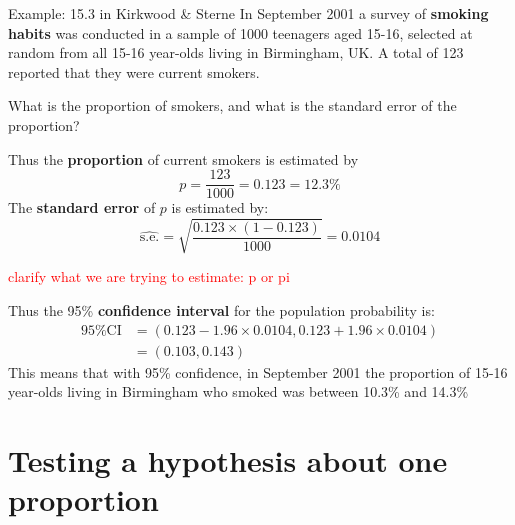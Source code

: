 \documentclass[compress, notes=hide]{beamer}
\newcommand{\hl}[1]{\textbf{#1}}
\begin{document}

\begin{frame}
\begin{block}{Example: 15.3 in Kirkwood \& Sterne}
  In September 2001 a survey of \hl{smoking habits} was conducted
  in a sample of 1000 teenagers aged 15-16, selected at random from
  all 15-16 year-olds living in Birmingham, UK. A total of 123
  reported that they were current smokers. 
  
  What is the proportion of smokers, and what is the standard error of the proportion?
\end{block}
\end{frame}

\begin{frame}
\begin{block}{}
  Thus the \hl{proportion} of current smokers is estimated by
\begin{equation*}
p = \frac{123}{1000} = 0.123 = 12.3\%
\end{equation*}
The \hl{standard error} of $p$ is estimated by:
\begin{equation*}
\widehat{\text{s.e.}} = \sqrt{ \frac{0.123 \times (1-0.123)}{1000} } = 0.0104
\end{equation*}

\textcolor{red}{clarify what we are trying to estimate: p or pi}
\end{block}
\end{frame}

\begin{frame}
\begin{block}{}
  Thus the 95\% \hl{confidence interval} for the population
  probability is:
\begin{align*}
\text{95\% CI} & = (0.123 - 1.96 \times 0.0104,0.123 + 1.96 \times 0.0104) \\
& = (0.103,0.143)
\end{align*}
This means that with 95\% confidence, in September 2001 the proportion
of 15-16 year-olds living in Birmingham who smoked was between 10.3\%
and 14.3\%
\end{block}
\end{frame}




\section{Testing a hypothesis about one proportion}
\end{document}

